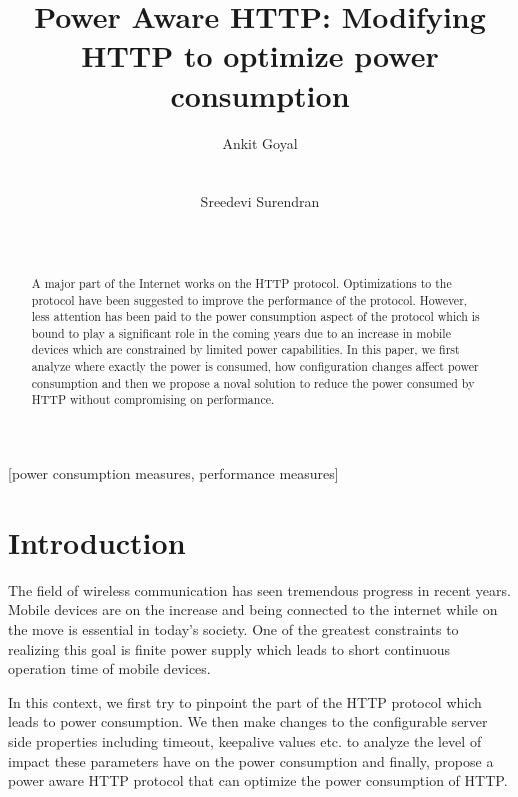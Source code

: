 \documentclass[9pt]{sigplan-proc-varsize}
\author{
%
\alignauthor Ankit Goyal\\
        \affaddr{Department of Computer Science}\\
        \affaddr{University of Texas at Austin}\\
       \email{ankitgoyal@utexas.edu}
\alignauthor Sreedevi Surendran \\
    \affaddr{Department of Computer Science}\\
    \affaddr{University of Texas at Austin}\\
    \email{sreedevi@cs.utexas.edu}
}
\title{Power Aware HTTP: Modifying HTTP to optimize power consumption}
\begin{document}
\maketitle


\begin{abstract}
\noindent A major part of the Internet works on the HTTP protocol. Optimizations to the protocol have been suggested to improve the performance of the protocol. However, less attention has been paid to the power consumption aspect of the protocol which is bound to play a significant role in the coming years due to an increase in mobile devices which are constrained by limited power capabilities. In this paper, we first analyze where exactly the power is consumed, how configuration changes affect power consumption and then we propose a noval solution to reduce the power consumed by HTTP without compromising on performance. 
\end{abstract} 

%
%

[power consumption measures,
performance measures]




\section{Introduction}
  \label{sec:intro}

The field of wireless communication has seen tremendous progress in recent years. Mobile devices are on the increase and being connected to the internet while on the move is essential in today’s society. One of the greatest constraints to realizing this goal is finite power supply which leads to short continuous operation time of mobile devices.

In this context, we first try to pinpoint the part of the HTTP protocol which leads to power consumption. We then make changes to the configurable server side properties including timeout, keepalive values etc. to analyze the level of impact these parameters have on the power consumption and finally, propose a power aware HTTP protocol that can optimize the power consumption of HTTP.
\end{document}
